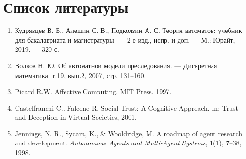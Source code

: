 \documentclass[12pt]{article}
\begin{document}
\clearpage
\section{Список литературы}

\begin{enumerate}
    \item Кудрявцев В. Б., Алешин С. В., Подколзин А. С. Теория автоматов: учебник для бакалавриата и магистратуры. — 2-е изд., испр. и доп. — М.: Юрайт, 2019. — 320 с.
    \item Волков Н. Ю. Об автоматной модели преследования. — Дискретная математика, т.19, вып.2, 2007, стр. 131–160.
    \item Picard R.W. Affective Computing. MIT Press, 1997.
    \item Castelfranchi C., Falcone R. Social Trust: A Cognitive Approach. In: Trust and Deception in Virtual Societies, 2001.
    \item Jennings, N. R., Sycara, K., \& Wooldridge, M. A roadmap of agent research and development. \textit{Autonomous Agents and Multi-Agent Systems}, 1(1), 7--38, 1998.
\end{enumerate}
\end{document}
